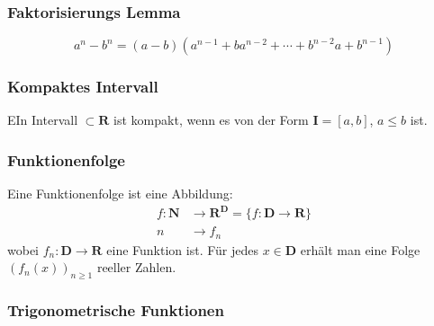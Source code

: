 \documentclass[8pt]{extarticle}
\begin{document}
\begin{multicols*}{3}
    \subsubsection {Faktorisierungs Lemma}
  
  $$
    a^n - b^n = (a-b)(a^{n-1} + ba^{n-2} + \cdots + b^{n-2}a + b^{n-1})
  $$

    \subsubsection {Kompaktes Intervall}
  
  EIn Intervall $\subset \mathbf{R}$ ist kompakt, wenn es von der Form $\mathbf{I} = [a, b]$,
  $a \leq b$ ist.

    \subsubsection {Funktionenfolge}
  
  Eine Funktionenfolge ist eine Abbildung:
  \begin{align*}
    f:\mathbf{N} & \rightarrow \mathbf{R}^\mathbf{D} = \{f:\mathbf{D} \rightarrow \mathbf{R}\} \\
    n            & \rightarrow f_n
  \end{align*}
  wobei $f_n: \mathbf{D} \rightarrow \mathbf{R}$ eine Funktion ist. Für jedes $x \in \mathbf{D}$
  erhält man eine Folge $(f_n(x))_{n \geq 1}$ reeller Zahlen.

    \subsubsection {Trigonometrische Funktionen}
  

\end{multicols*}
\end{document}
